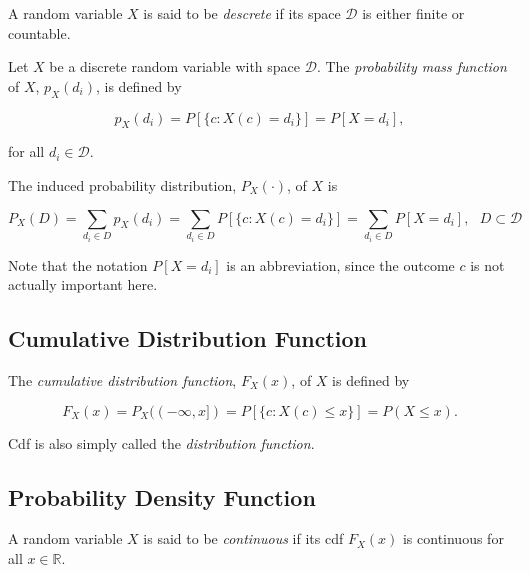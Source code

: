 \documentclass{article}
\begin{document}
            A random variable $ X $ is said to be \textit{descrete} if its
            space $ \mathcal{D} $ is either finite or countable.

            Let $ X $ be a discrete random variable with space $ \mathcal{D} $.
            The \textit{probability mass function} of $ X $, $ p_{X}(d_{i}) $,
            is defined by

            \begin{equation*}
                p_{X}(d_{i}) = P[\{ c: X(c) = d_{i} \}] = P[ X = d_{i} ],
            \end{equation*}

            for all $ d_{i} \in \mathcal{D} $.

            The induced probability distribution, $ P_{X}(\cdot) $, of $ X $ is

            \begin{equation*}
                P_{X}(D) = \sum_{ d_{i} \in D} p_{X}(d_{i}) = \sum_{ d_{i} \in
                D} P[\{ c: X(c) = d_{i} \}] = \sum_{d_{i} \in D} P[ X = d_{i}],
                \text{ } D \subset \mathcal{D}
            \end{equation*}

            Note that the notation $ P[ X = d_{i}] $ is an abbreviation, since
            the outcome $ c $ is not actually important here.

        \subsection{Cumulative Distribution Function}

            The \textit{cumulative distribution function}, $ F_{X}(x) $, of $ X
            $ is defined by

            \begin{equation*}
                F_{X}(x) = P_{X}((-\infty, x]) = P[\{ c: X(c) \leq x \}] = P (
                { X \leq x } ).
            \end{equation*}

            Cdf is also simply called the \textit{distribution function}.

        \subsection{Probability Density Function}

            A random variable $ X $ is said to be \textit{continuous} if
            its cdf $ F_{X}(x) $ is continuous for all $ x \in \mathbb{R} $.
\end{document}
